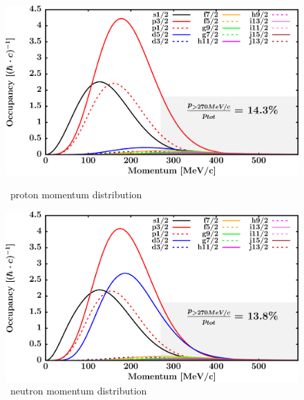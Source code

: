 \begin{figure}[hbtp]
    \centering
    \begin{minipage}{0.45\textwidth}
        \centering
        \includegraphics[width=\textwidth]{figures/o18_protonLJMomentumDistIntegral.png}
        \caption*{\oEight\ proton momentum distribution}
        \label{DOMFitData_o18_proton_momentumDist}
    \end{minipage}\hspace{6pt}
    \begin{minipage}{0.45\textwidth}
        \centering
        \includegraphics[width=\textwidth]{figures/o18_neutronLJMomentumDistIntegral.png}
        \caption*{\oEight\ neutron momentum distribution}
        \label{DOMFitData_o18_neutron_momentumDist}
    \end{minipage}
\end{figure}
\vspace{0.3in}
